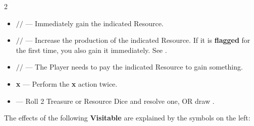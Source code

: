 \begin{multicols*}{2}
\begin{itemize}[itemsep=0.4em]
  \item [{\LARGE$\boldsymbol{+}$}]
    $\boldsymbol{/}$$\boldsymbol{/}$ —
    Immediately gain the indicated Resource.
  \item [{\svg[14]{ongoing}}]
    $\boldsymbol{/}$$\boldsymbol{/}$ —
    Increase the production of the indicated Resource.
    If it is \textbf{flagged} for the first time, you also gain it immediately. See .
  \item [{\svg[10]{pay}}]
    $\boldsymbol{/}$$\boldsymbol{/}$  —
    The Player needs to pay the indicated Resource to gain something.
  \item [{\LARGE\textbf{2}}] {\LARGE\textbf{x}} —
    Perform the {\LARGE\textbf{x}} action twice.
  \item [{\LARGE\textbf{2}}]    —
    Roll 2 Treasure or Resource Dice and resolve one,
    OR draw .
\end{itemize}

\columnbreak


The effects of the following \textbf{Visitable}  are explained by the symbols on the left:

\medskip

{\centering

  \bigskip

  \\

  \bigskip

  \\
}
\end{multicols*}

\pagebreak

